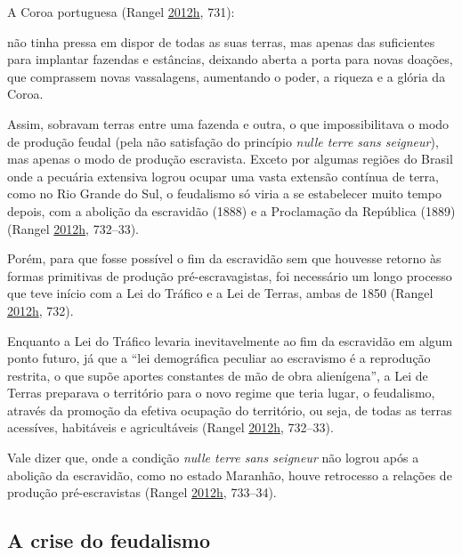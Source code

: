 \documentclass[
	12pt,				%
	oneside,			%
	a4paper,			%
	chapter=TITLE,		%
	section=TITLE,		%
	english,			%
	brazil				%
	]{abntex2}
\begin{document}
A Coroa portuguesa (Rangel \protect\hyperlink{ref-rangel1989}{2012}\protect\hyperlink{ref-rangel1989}{h}, 731):
\begin{citacao}
não tinha pressa em dispor de todas as suas terras, mas apenas das suficientes
para implantar fazendas e estâncias, deixando aberta a porta para novas doações,
que comprassem novas vassalagens, aumentando o poder, a riqueza e a glória da
Coroa.
\end{citacao}
Assim, sobravam terras entre uma fazenda e outra, o que impossibilitava o modo
de produção feudal (pela não satisfação do princípio \emph{nulle terre sans
seigneur}), mas apenas o modo de produção escravista. Exceto por algumas regiões
do Brasil onde a pecuária extensiva logrou ocupar uma vasta extensão contínua de
terra, como no Rio Grande do Sul, o feudalismo só viria a se estabelecer muito
tempo depois, com a abolição da escravidão (1888) e a Proclamação da República
(1889) (Rangel \protect\hyperlink{ref-rangel1989}{2012}\protect\hyperlink{ref-rangel1989}{h}, 732--33).

Porém, para que fosse possível o fim da escravidão sem que houvesse retorno às
formas primitivas de produção pré-escravagistas, foi necessário um longo
processo que teve início com a Lei do Tráfico e a Lei de Terras, ambas de 1850
(Rangel \protect\hyperlink{ref-rangel1989}{2012}\protect\hyperlink{ref-rangel1989}{h}, 732).

Enquanto a Lei do Tráfico levaria inevitavelmente ao fim da escravidão em algum
ponto futuro, já que a ``lei demográfica peculiar ao escravismo é a reprodução
restrita, o que supõe aportes constantes de mão de obra alienígena'', a Lei de
Terras preparava o território para o novo regime que teria lugar, o feudalismo,
através da promoção da efetiva ocupação do território, ou seja, de todas as
terras acessíves, habitáveis e agricultáveis (Rangel \protect\hyperlink{ref-rangel1989}{2012}\protect\hyperlink{ref-rangel1989}{h}, 732--33).

Vale dizer que, onde a condição \emph{nulle terre sans seigneur} não logrou após a
abolição da escravidão, como no estado Maranhão, houve retrocesso a relações de
produção pré-escravistas (Rangel \protect\hyperlink{ref-rangel1989}{2012}\protect\hyperlink{ref-rangel1989}{h}, 733--34).

\hypertarget{a-crise-do-feudalismo}{%
\subsection{A crise do feudalismo}\label{a-crise-do-feudalismo}}
\end{document}
